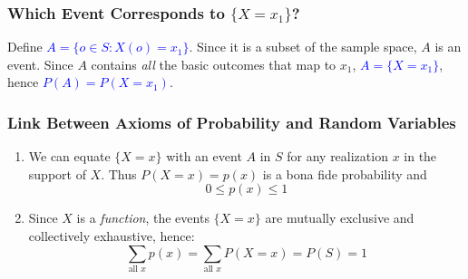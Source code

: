 \begin{frame}
\frametitle{Which Event Corresponds to $\{X=x_1\}$?}

\begin{figure}
	\centering
{}
\end{figure}



Define \textcolor{blue}{$A = \{o \in S \colon X(o) = x_1\}$}. Since it is a subset of the sample space, $A$ is an event. Since $A$ contains \emph{all} the basic outcomes that map to $x_1$, \textcolor{blue}{$A = \{X=x_1\}$}, hence \textcolor{blue}{$P(A) = P(X=x_1)$}.


\end{frame}
\begin{frame}
	\frametitle{Link Between Axioms of Probability and Random Variables}

	\begin{enumerate}
		\item We can equate $\{X=x\}$ with an event $A$ in $S$ for any realization $x$ in the support of $X$. Thus $P(X=x) = p(x)$ is a bona fide probability and
				$$0 \leq p(x) \leq 1$$
		\item Since $X$ is a \emph{function}, the events $\{X= x\}$ are \alert{mutually exclusive} and \alert{collectively exhaustive}, hence:
		$$\sum_{\mbox{all } x} p(x) = \sum_{\mbox{all } x} P(X=x) = P(S) = 1$$
	\end{enumerate}

\end{frame}

